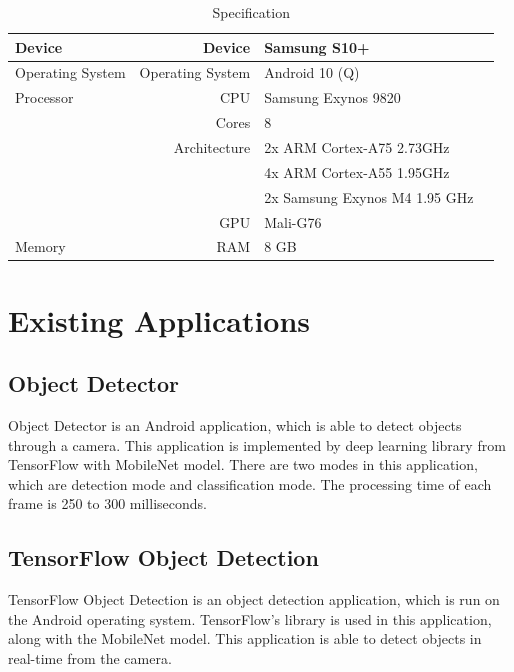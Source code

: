         \begin{table}[!htp]\centering
            \scriptsize
            \begin{tabular}{lrll}\toprule
                Device              &Device             &Samsung S10+ \\ \hline
                Operating System    &Operating System   &Android 10 (Q) \\ \hline
                Processor           &CPU                &Samsung Exynos 9820 \\
                                    &Cores              &8 \\
                                    &Architecture       &2x ARM Cortex-A75 2.73GHz \\
                                    &                   &4x ARM Cortex-A55 1.95GHz \\
                                    &                   &2x Samsung Exynos M4 1.95 GHz \\
                                    &GPU                &Mali-G76 \\ \hline
                Memory              &RAM                &8 GB \\
                \bottomrule
            \end{tabular}

            \caption{Specification}\label{specification}
        \end{table}


    \section{Existing Applications}
        \subsection{Object Detector}
            Object Detector is an Android application, which is able to detect objects through a camera.
            This application is implemented by deep learning library from TensorFlow with
            MobileNet model. There are two modes in this application,
            which are detection mode and classification mode.
            The processing time of each frame is 250 to 300 milliseconds.

        \subsection{TensorFlow Object Detection}
            TensorFlow Object Detection is an object detection application,
            which is run on the Android operating system.
            TensorFlow's library is used in this application, along with the MobileNet model.
            This application is able to detect objects in real-time from the camera.


